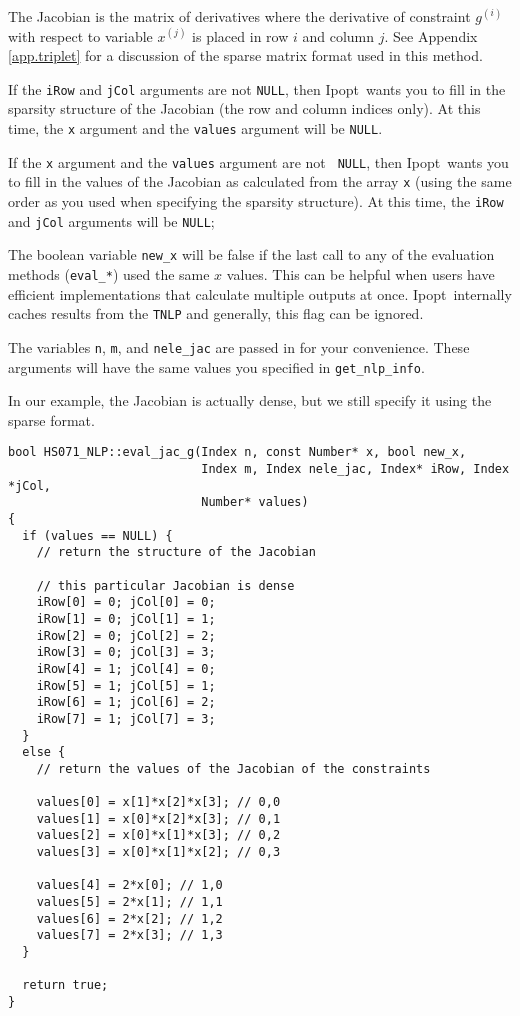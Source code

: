 \documentclass[10pt]{article}
\newcommand{\Ipopt}{{\sc Ipopt}}
\begin{document}
The Jacobian is the matrix of derivatives where the derivative of
constraint $g^{(i)}$ with respect to variable $x^{(j)}$ is placed in
row $i$ and column $j$. See Appendix \ref{app.triplet} for a
discussion of the sparse matrix format used in this method.

If the {\tt iRow} and {\tt jCol} arguments are not {\tt NULL}, then
\Ipopt\ wants you to fill in the sparsity structure of the Jacobian
(the row and column indices only). At this time, the {\tt x} argument
and the {\tt values} argument will be {\tt NULL}.

If the {\tt x} argument and the {\tt values} argument are not {\tt
  NULL}, then \Ipopt\ wants you to fill in the values of the Jacobian
as calculated from the array {\tt x} (using the same order as you used
when specifying the sparsity structure). At this time, the {\tt iRow}
and {\tt jCol} arguments will be {\tt NULL};

The boolean variable {\tt new\_x} will be false if the last call to
any of the evaluation methods ({\tt eval\_*}) used the same $x$
values. This can be helpful when users have efficient implementations
that calculate multiple outputs at once. \Ipopt\ internally caches
results from the {\tt TNLP} and generally, this flag can be ignored.

The variables {\tt n}, {\tt m}, and {\tt nele\_jac} are passed in for
your convenience. These arguments will have the same values you
specified in {\tt get\_nlp\_info}.

In our example, the Jacobian is actually dense, but we still
specify it using the sparse format.

\begin{footnotesize}
\begin{verbatim}
bool HS071_NLP::eval_jac_g(Index n, const Number* x, bool new_x,
                           Index m, Index nele_jac, Index* iRow, Index *jCol,
                           Number* values)
{
  if (values == NULL) {
    // return the structure of the Jacobian

    // this particular Jacobian is dense
    iRow[0] = 0; jCol[0] = 0;
    iRow[1] = 0; jCol[1] = 1;
    iRow[2] = 0; jCol[2] = 2;
    iRow[3] = 0; jCol[3] = 3;
    iRow[4] = 1; jCol[4] = 0;
    iRow[5] = 1; jCol[5] = 1;
    iRow[6] = 1; jCol[6] = 2;
    iRow[7] = 1; jCol[7] = 3;
  }
  else {
    // return the values of the Jacobian of the constraints
    
    values[0] = x[1]*x[2]*x[3]; // 0,0
    values[1] = x[0]*x[2]*x[3]; // 0,1
    values[2] = x[0]*x[1]*x[3]; // 0,2
    values[3] = x[0]*x[1]*x[2]; // 0,3

    values[4] = 2*x[0]; // 1,0
    values[5] = 2*x[1]; // 1,1
    values[6] = 2*x[2]; // 1,2
    values[7] = 2*x[3]; // 1,3
  }

  return true;
}
\end{verbatim}
\end{footnotesize}
\end{document}
